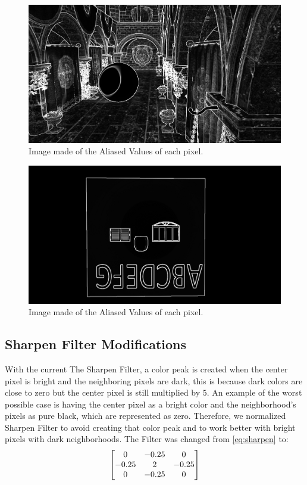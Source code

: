 \documentclass[pregrado]{tesis-usb} %
\begin{document}
\begin{figure}[H]
	\centering
	\includegraphics[scale=0.2]{images/aliased_value_example_2_temporal.png}
	\caption{Image made of the Aliased Values of each pixel.}\label{fig:aliasedval2}
\end{figure}

\begin{figure}[H]
	\centering
	\includegraphics[scale=0.2]{images/aliased_value_example_3_temporal.png}
	\caption{Image made of the Aliased Values of each pixel.}\label{fig:aliasedval3}
\end{figure}

\subsection{Sharpen Filter Modifications}
With the current The Sharpen Filter, a color peak is created when the center pixel is bright and the neighboring pixels are dark, this is because dark colors are close to zero but the center pixel is still multiplied by $5$. An example of the worst possible case is having the center pixel as a bright color and the neighborhood’s pixels as pure black, which are represented as zero. Therefore, we normalized Sharpen Filter to avoid creating that color peak and to work better with bright pixels with dark neighborhoods. The Filter was changed from \ref{eq:sharpen} to:
\begin{equation} \label{eq:new_sharpen}
\centering
\begin{bmatrix*}[c]
0 & -0.25 &  0 \\
-0.25  &  2 & -0.25  \\
0 & -0.25  &  0
\end{bmatrix*}
\end{equation}
\end{document}
